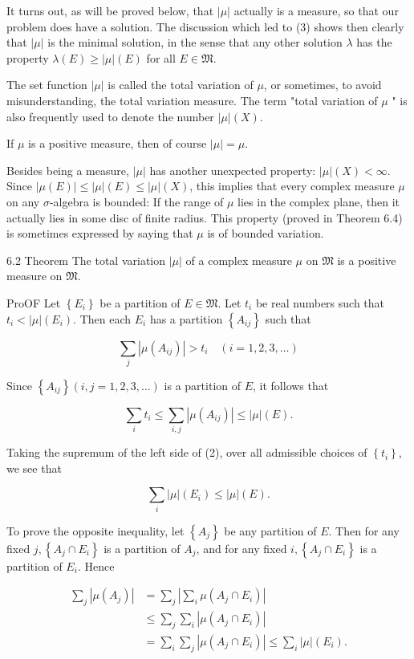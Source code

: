 \documentclass[10pt]{article}
\begin{document}
It turns out, as will be proved below, that $|\mu|$ actually is a measure, so that our problem does have a solution. The discussion which led to (3) shows then clearly that $|\mu|$ is the minimal solution, in the sense that any other solution $\lambda$ has the property $\lambda(E) \geq|\mu|(E)$ for all $E \in \mathfrak{M}$.

The set function $|\mu|$ is called the total variation of $\mu$, or sometimes, to avoid misunderstanding, the total variation measure. The term "total variation of $\mu$ " is also frequently used to denote the number $|\mu|(X)$.

If $\mu$ is a positive measure, then of course $|\mu|=\mu$.

Besides being a measure, $|\mu|$ has another unexpected property: $|\mu|(X)<\infty$. Since $|\mu(E)| \leq|\mu|(E) \leq|\mu|(X)$, this implies that every complex measure $\mu$ on any $\sigma$-algebra is bounded: If the range of $\mu$ lies in the complex plane, then it actually lies in some disc of finite radius. This property (proved in Theorem 6.4) is sometimes expressed by saying that $\mu$ is of bounded variation.

6.2 Theorem The total variation $|\mu|$ of a complex measure $\mu$ on $\mathfrak{M}$ is a positive measure on $\mathfrak{M}$.

ProOF Let $\left\{E_{i}\right\}$ be a partition of $E \in \mathfrak{M}$. Let $t_{i}$ be real numbers such that $t_{i}<|\mu|\left(E_{i}\right)$. Then each $E_{i}$ has a partition $\left\{A_{i j}\right\}$ such that

$$
\sum_{j}\left|\mu\left(A_{i j}\right)\right|>t_{i} \quad(i=1,2,3, \ldots)
$$

Since $\left\{A_{i j}\right\}(i, j=1,2,3, \ldots)$ is a partition of $E$, it follows that

$$
\sum_{i} t_{i} \leq \sum_{i, j}\left|\mu\left(A_{i j}\right)\right| \leq|\mu|(E) .
$$

Taking the supremum of the left side of (2), over all admissible choices of $\left\{t_{i}\right\}$, we see that

$$
\sum_{i}|\mu|\left(E_{i}\right) \leq|\mu|(E) .
$$

To prove the opposite inequality, let $\left\{A_{j}\right\}$ be any partition of $E$. Then for any fixed $j,\left\{A_{j} \cap E_{i}\right\}$ is a partition of $A_{j}$, and for any fixed $i,\left\{A_{j} \cap E_{i}\right\}$ is a partition of $E_{i}$. Hence

$$
\begin{aligned}
\sum_{j}\left|\mu\left(A_{j}\right)\right| & =\sum_{j}\left|\sum_{i} \mu\left(A_{j} \cap E_{i}\right)\right| \\
& \leq \sum_{j} \sum_{i}\left|\mu\left(A_{j} \cap E_{i}\right)\right| \\
& =\sum_{i} \sum_{j}\left|\mu\left(A_{j} \cap E_{i}\right)\right| \leq \sum_{i}|\mu|\left(E_{i}\right) .
\end{aligned}
$$
\end{document}
